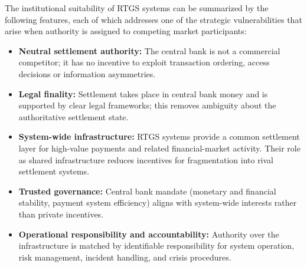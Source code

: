 \documentclass[
reprint,
showkeys,
superscriptaddress,
aps,
pra,
longbibliography,
nofootinbib,
]{revtex4-2}
\theoremstyle{definition}\newtheorem{definition}{Definition}
\begin{document}
The institutional suitability of RTGS systems can be summarized by the following features, each of which addresses one of the strategic vulnerabilities that arise when authority is assigned to competing market participants:
\begin{itemize}
	\setlength\itemsep{0.1em}
	\item \textbf{Neutral settlement authority:} The central bank is not a commercial competitor; it has no incentive to exploit transaction ordering, access decisions or information asymmetries.
	
	\item \textbf{Legal finality:} Settlement takes place in central bank money and is supported by clear legal frameworks; this removes ambiguity about the authoritative settlement state.
	
	\item \textbf{System-wide infrastructure:} RTGS systems provide a common settlement layer for high-value payments and related financial-market activity. Their role as shared infrastructure reduces incentives for fragmentation into rival settlement systems.
	
	\item \textbf{Trusted governance:} Central bank mandate (monetary and financial stability, payment system efficiency) aligns with system-wide interests rather than private incentives.
	
	\item \textbf{Operational responsibility and accountability:} Authority over the infrastructure is matched by identifiable responsibility for system operation, risk management, incident handling, and crisis procedures.

	
\end{itemize}
\end{document}
